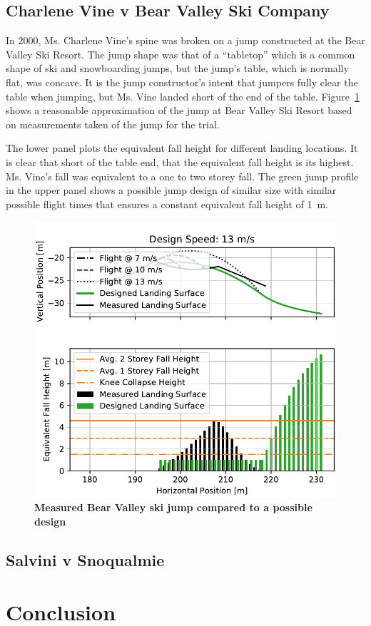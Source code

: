 \documentclass{article}
\begin{document}
\subsection{Charlene Vine v Bear Valley Ski Company}
%
In 2000, Ms. Charlene Vine's spine was broken on a jump constructed at the Bear Valley
Ski Resort. The jump shape was that of a ``tabletop'' which is a common shape
of ski and snowboarding jumps, but the jump's table, which is normally flat,
was concave. It is the jump constructor's intent that jumpers fully clear the
table when jumping, but Ms. Vine landed short of the end of the table.
Figure~\ref{fig:vine-v-bear-valley} shows a reasonable approximation of the
jump at Bear Valley Ski Resort based on measurements taken of the jump for the
trial.

The lower panel plots the equivalent fall height for different landing
locations. It is clear that short of the table end, that the equivalent fall
height is its highest. Ms. Vine's fall was equivalent to a one to two storey
fall. The green jump profile in the upper panel shows a possible jump design of
similar size with similar possible flight times that ensures a constant
equivalent fall height of 1~\si{\meter}.
%
\begin{figure}
  \centering
  \includegraphics[width=5.25in]{figures/vine-v-bear-valley.pdf}
  \caption{\textbf{Measured Bear Valley ski jump compared to a possible design}}
  \label{fig:vine-v-bear-valley}
\end{figure}

\subsection{Salvini v Snoqualmie}

\section{Conclusion}
%


\end{document}
